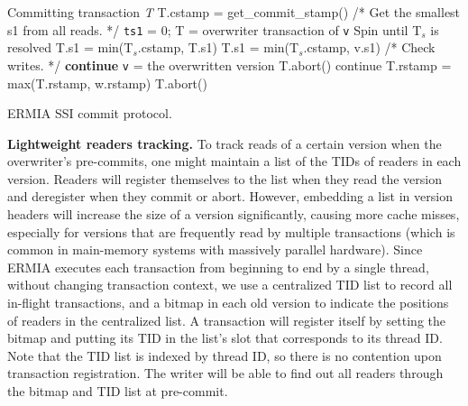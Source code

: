 \begin{algorithm}
\begin{algorithmic}[1]
 Committing transaction \textit{T}
\STATE T.cstamp = get\_commit\_stamp()
\STATE /* Get the smallest s1 from all reads. */
\STATE \texttt{ts1} = 0;
\STATE T = overwriter transaction of \texttt{v}
\STATE Spin until T$_s$ is resolved
\STATE T.s1 = min(T$_s$.cstamp, T.s1)
\ENDIF
\ELSE
\STATE T.s1 = min(T$_s$.cstamp, v.s1)
\ENDIF
\ENDFOR
\STATE
\STATE /* Check writes. */
\STATE \textbf{continue}
\ENDIF
\STATE \texttt{v} = the overwritten version
\STATE T.abort()
\ENDIF
{}
\STATE continue
\ENDIF
\STATE T.rstamp = max(T.rstamp, w.rstamp)
\STATE T.abort()
\ENDIF
\ENDFOR
\ENDFOR
\end{algorithmic}
\label{alg-ssi-commit}
\caption{ERMIA SSI commit protocol.}
\end{algorithm}

{\bf Lightweight readers tracking.}
To track reads of a certain version when the overwriter's pre-commits, one might maintain a list of the TIDs of readers in each version. Readers will register themselves to the list when they read the version and deregister when they commit or abort. However, embedding a list in version headers will increase the size of a version significantly, causing more cache misses, especially for versions that are frequently read by multiple transactions (which is common in main-memory systems with massively parallel hardware). Since ERMIA executes each transaction from beginning to end by a single thread, without changing transaction context, we use a centralized TID list to record all in-flight transactions, and a bitmap in each old version to indicate the positions of readers in the centralized list. A transaction will register itself by setting the bitmap and putting its TID in the list's slot that corresponds to its thread ID. Note that the TID list is indexed by thread ID, so there is no contention upon transaction registration. The writer will be able to find out all readers through the bitmap and TID list at pre-commit.

